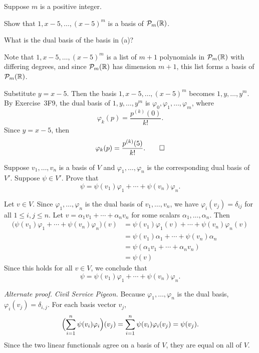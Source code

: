 \begin{exercise}
Suppose $m$ is a positive integer.
\begin{parts}
\item Show that $1,x-5,\dots,(x-5)^m$ is a basis of $\mathcal{P}_m(\mathbb{R})$.
\item What is the dual basis of the basis in (a)?
\end{parts}
\end{exercise}
\begin{solution}\leavevmode
\begin{parts}
\item Note that $1,x-5,\dots,(x-5)^m$ is a list of $m+1$ polynomials in
  $\mathcal{P}_m(\mathbb{R})$ with differing degrees, and since $\mathcal{P}_m(\mathbb{R})$ has dimension
  $m+1$, this list forms a basis of $\mathcal{P}_m(\mathbb{R})$.
\item Substitute $y=x-5$. Then the basis $1,x-5,\dots,(x-5)^m$ becomes
  $1,y,\dots,y^m$. By Exercise~3F9, the dual basis of $1,y,\dots,y^m$ is
  $\varphi_0,\varphi_1,\dots,\varphi_m$, where
  \[ \varphi_k(p) = \frac{p^{(k)}(0)}{k!}. \]
  Since $y=x-5$, then
  \[ \varphi_k(p) = \frac{p^{(k)}(5)}{k!}. \qedhere \]
\end{parts}
\end{solution}

\begin{exercise}
Suppose $v_1,\dots,v_n$ is a basis of $V$ and $\varphi_1,\dots,\varphi_n$ is the
corresponding dual basis of $V'$. Suppose $\psi\in V'$. Prove that
\[ \psi = \psi(v_1)\varphi_1+\cdots+\psi(v_n)\varphi_n. \]
\end{exercise}
\begin{solution}
Let $v\in V$. Since $\varphi_1,\dots,\varphi_n$ is the dual basis of
$v_1,\dots,v_n$, we have $\varphi_i(v_j)=\delta_{ij}$ for all $1\le i,j\le n$.
Let $v=\alpha_1v_1+\cdots+\alpha_nv_n$ for some scalars
$\alpha_1,\dots,\alpha_n$. Then
\begin{align*}
\bigl(\psi(v_1)\varphi_1+\cdots+\psi(v_n)\varphi_n\bigr)(v)
 &= \psi(v_1)\varphi_1(v)+\cdots+\psi(v_n)\varphi_n(v)\\
 &= \psi(v_1)\alpha_1+\cdots+\psi(v_n)\alpha_n\\
 &= \psi(\alpha_1v_1+\cdots+\alpha_nv_n)\\
 &= \psi(v)
\end{align*}
Since this holds for all $v\in V$, we conclude that
\[ \psi = \psi(v_1)\varphi_1+\cdots+\psi(v_n)\varphi_n. \]

\emph{Alternate proof.} \emph{Civil Service Pigeon.} Because
$\varphi_1,\dots,\varphi_n$ is the dual basis, $\varphi_i(v_j)=\delta_{i,j}$.
For each basis vector $v_j$,
\[ \Bigl(\sum_{i=1}^n\psi(v_i)\varphi_i\Bigr)(v_j)
   = \sum_{i=1}^n\psi(v_i)\varphi_i(v_j) = \psi(v_j). \]
Since the two linear functionals agree on a basis of $V$, they are equal on all
of $V$.
\end{solution}


